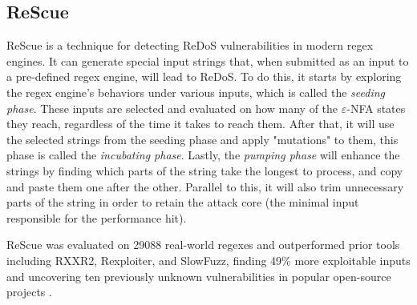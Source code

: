 
\subsection{ReScue}

ReScue is a technique for detecting ReDoS vulnerabilities in modern regex engines. It can generate special input strings that, when submitted as an input to a pre-defined regex engine, will lead to ReDoS. To do this, it starts by exploring the regex engine's behaviors under various inputs, which is called the \textit{seeding phase}. These inputs are selected and evaluated on how many of the $\varepsilon$-NFA states they reach, regardless of the time it takes to reach them. After that, it will use the selected strings from the seeding phase and apply "mutations" to them, this phase is called the \textit{incubating phase}. Lastly, the \textit{pumping phase} will enhance the strings by finding which parts of the string take the longest to process, and copy and paste them one after the other. Parallel to this, it will also trim unnecessary parts of the string in order to retain the attack core (the minimal input responsible for the performance hit). \cite{rescue_paper}

ReScue was evaluated on 29088 real-world regexes and outperformed prior tools including RXXR2, Rexploiter, and SlowFuzz, finding 49\% more exploitable inputs and uncovering ten previously unknown vulnerabilities in popular open-source projects \cite{rescue_paper}.

